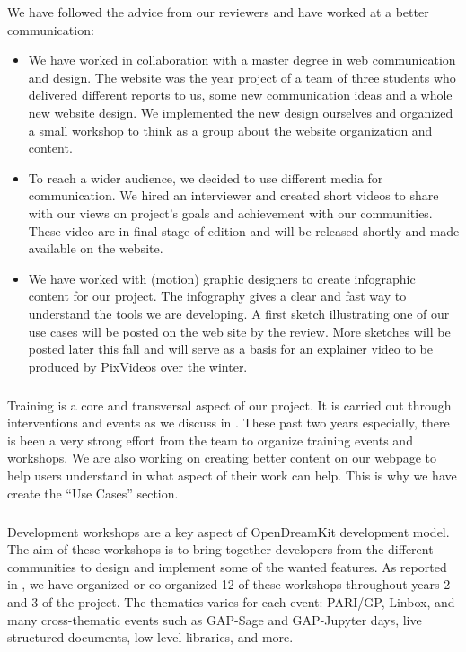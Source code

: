 We have followed the advice from our reviewers and have worked at a better communication:
\begin{itemize}
\item We have worked in collaboration with a master degree in web communication and design. The
\ODK website was the year project of a team of three students who delivered different reports to us, some
new communication ideas and a whole new website design. We implemented the new design ourselves and
organized a small workshop to think as a group about the website organization and content.
\item To reach a wider audience, we decided to use different media for communication. We hired an interviewer
and created short videos to share with our views on project's goals and achievement with our communities. These
video are in final stage of edition and will be released shortly and made available on the website.

\item We have worked with (motion) graphic designers to create
  infographic content for our project. The infography gives a clear
  and fast way to understand the tools we are developing. A first
  sketch illustrating one of our use cases will be posted on the web
  site by the review. More sketches will be posted later this fall and
  will serve as a basis for an explainer video to be produced by
  PixVideos over the winter.
\end{itemize}

\subparagraph{}

Training is a core and transversal aspect of our project. It is carried out
through interventions and events as we discuss in . These
past two years especially, there is been a very strong effort from the \ODK team to organize
training events and workshops. We are also working on creating better content on our webpage
to help users understand in what aspect of their work can \ODK help. This is why we have create the
``Use Cases'' section.

\subparagraph{}
\label{dissem@devel-workshops}

Development workshops are a key aspect of OpenDreamKit development model. The aim of these workshops is to bring together developers from the different communities to design and implement some
of the wanted features. As reported in , we have organized
or co-organized 12 of these workshops throughout years 2 and 3 of the project. The thematics varies
for each event: PARI/GP, Linbox, and many cross-thematic events such as GAP-Sage and GAP-Jupyter days,
live structured documents, low level libraries, and more.

